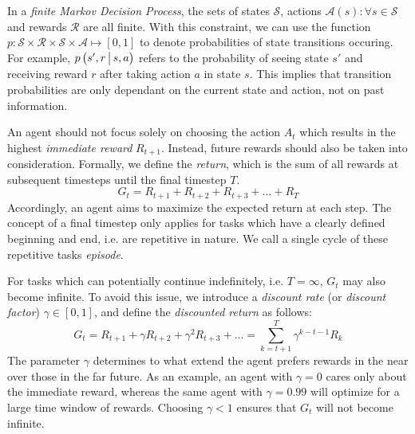 In a \textit{finite Markov Decision Process}, the sets of states $\mathscr{S}$, actions $\mathscr{A}(s) : \forall s \in \mathscr{S}$ and rewards $\mathscr{R}$ are all finite. With this constraint, we can use the function $p : \mathscr{S} \times \mathscr{R} \times \mathscr{S} \times \mathscr{A} \mapsto \left[0, 1\right]$ to denote probabilities of state transitions occuring. For example, $p\left(s', r \,\middle|\, s, a\right)$ refers to the probability of seeing state $s'$ and receiving reward $r$ after taking action $a$ in state $s$. This implies that transition probabilities are only dependant on the current state and action, not on past information. \cite{sutton}

An agent should not focus solely on choosing the action $A_t$ which results in the highest \textit{immediate reward} $R_{t+1}$. Instead, future rewards should also be taken into consideration. Formally, we define the \textit{return}, which is the sum of all rewards at subsequent timesteps until the final timestep $T$.
\begin{equation*}
    G_t = R_{t+1} + R_{t+2} + R_{t+3} + ... + R_T
\end{equation*}
Accordingly, an agent aims to maximize the expected return at each step. The concept of a final timestep only applies for tasks which have a clearly defined beginning and end, i.e. are repetitive in nature. We call a single cycle of these repetitive tasks \textit{episode}. \cite{sutton}

For tasks which can potentially continue indefinitely, i.e. $T = \infty$, $G_t$ may also become infinite. To avoid this issue, we introduce a \textit{discount rate} (or \textit{discount factor}) $\gamma \in [0, 1]$, and define the \textit{discounted return} as follows:
\begin{equation*}
    G_t = R_{t+1} + \gamma R_{t+2} + \gamma^2 R_{t+3} + ...
        = \sum_{k=t+1}^T \gamma^{k-t-1} R_k
\end{equation*}
The parameter $\gamma$ determines to what extend the agent prefers rewards in the near over those in the far future. As an example, an agent with $\gamma = 0$ cares only about the immediate reward, whereas the same agent with $\gamma = 0.99$ will optimize for a large time window of rewards. Choosing $\gamma < 1$ ensures that $G_t$ will not become infinite. \cite{sutton}